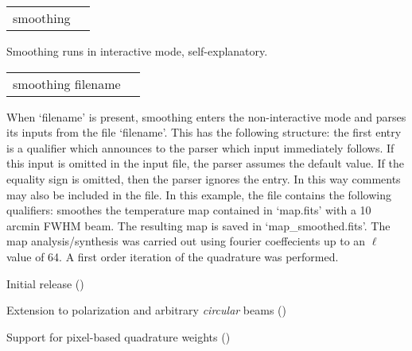 \begin{examples}{1}
{
\begin{tabular}{ll} %
smoothing  \\
\end{tabular}
}
{
Smoothing runs in interactive mode, self-explanatory. 
}
\end{examples}

\vfill\newpage

\begin{examples}{2}
{
\begin{tabular}{ll} %
smoothing  filename \\
\end{tabular}
}
{When `filename' is present, smoothing enters the non-interactive mode and parses
its inputs from the file `filename'. This has the following
structure: the first entry is a qualifier which announces to the parser
which input immediately follows. If this input is omitted in the
input file, the parser assumes the default value.
If the equality sign is omitted, then the parser ignores the entry.
In this way comments may also be included in the file.
In this example, the file contains the following
qualifiers:\hfill\newline
{}
smoothes the \healpix temperature map contained in `map.fits' with 
a 10 arcmin FWHM beam. The resulting map is saved 
in `map\_smoothed.fits'. The map analysis/synthesis was carried 
out using fourier coeffecients up to an $\ell$ value of 64. A first
order iteration of the quadrature was performed.}

\end{examples}

\begin{release}
  \begin{relist}
    \item Initial release ()
    \item Extension to polarization and arbitrary {\em circular} beams ()
    \item Support for pixel-based quadrature weights ()
  \end{relist}
\end{release}

